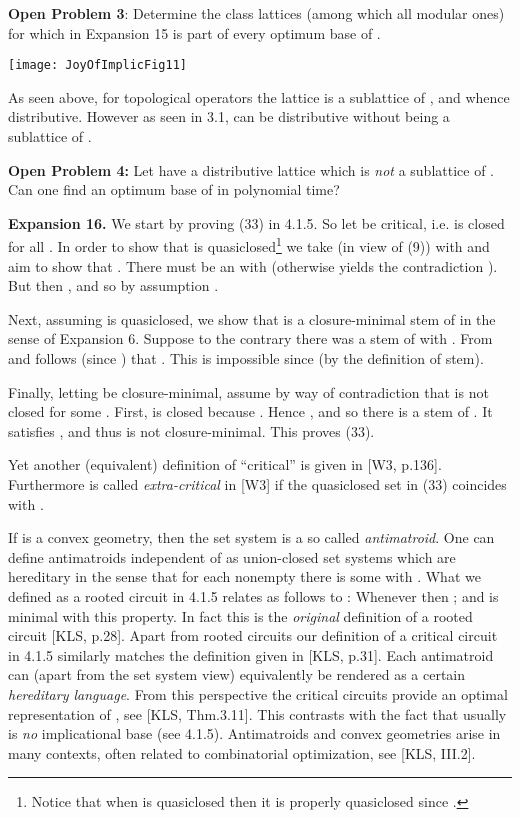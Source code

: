 \documentclass[11pt]{article}
\begin{document}
{\bf Open Problem 3}: Determine the class  lattices  (among which all modular ones) for which  in Expansion 15 is part of every optimum base of .



\begin{center}
\texttt{[image: JoyOfImplicFig11]}
\end{center}

As seen above, for topological operators  the lattice  is a sublattice of , and whence distributive. However as seen in 3.1,  can be distributive without being a sublattice of .

{\bf Open Problem 4:} Let  have a distributive lattice  which is {\it not} a sublattice of . Can one find an optimum base of  in polynomial time?



{\bf Expansion 16.} We start by proving (33) in 4.1.5. So let  be critical, i.e.  is closed for all . In order to show that  is quasiclosed\footnote{Notice that when  is quasiclosed then it is properly quasiclosed since .} we take (in view of (9))  with  and aim to show that . There must be an  with  (otherwise  yields the contradiction ). But then , and so by assumption .

Next, assuming  is quasiclosed, we show that  is a closure-minimal stem of  in the sense of Expansion 6. Suppose to the contrary there was a stem  of  with . From  and  follows (since ) that . This is impossible since  (by the definition of stem).

 Finally, letting  be closure-minimal, assume by way of contradiction that  is not closed for some . First,  is closed because . Hence , and so there is a stem  of . It satisfies , and thus  is not closure-minimal.  This proves (33). \quad 
 
 Yet another (equivalent) definition of ``critical'' is given in [W3, p.136]. Furthermore  is called {\it extra-critical} in [W3] if the quasiclosed set  in 
 (33) coincides with .
  
  If  is a convex geometry, then the set system  is a so called {\it antimatroid}. One can define antimatroids independent of  as union-closed set systems  which are hereditary in the sense that for each nonempty  there is some  with . What we defined as a rooted circuit  in 4.1.5 relates as follows to : Whenever  then ; and  is minimal with this property. In fact this is the {\it original} definition of a rooted circuit [KLS, p.28]. Apart from rooted circuits our definition of a critical circuit  in 4.1.5 similarly matches the definition given in [KLS, p.31]. Each antimatroid  can (apart from the set system view) equivalently be rendered as a certain {\it hereditary language}. From this perspective the critical circuits provide an optimal representation of , see [KLS, Thm.3.11]. This contrasts with the fact that  usually is {\it no} implicational base (see 4.1.5). Antimatroids and convex geometries arise in many contexts, often related to combinatorial optimization, see [KLS, III.2].
  
\end{document}
